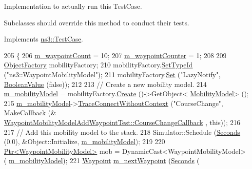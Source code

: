Implementation to actually run this Test\+Case. 

Subclasses should override this method to conduct their tests. 

Implements \hyperlink{classns3_1_1TestCase_a8ff74680cf017ed42011e4be51917a24}{ns3\+::\+Test\+Case}.


\begin{DoxyCode}
205 \{
206   \hyperlink{classWaypointMobilityModelAddWaypointTest_a3db7a04e25567d5d432ff56c33195ba6}{m\_waypointCount} = 10;
207   \hyperlink{classWaypointMobilityModelAddWaypointTest_a7e15fee40f671868d937ca440d71f5e1}{m\_waypointCounter} = 1;
208 
209   \hyperlink{classns3_1_1ObjectFactory}{ObjectFactory} mobilityFactory;
210   mobilityFactory.\hyperlink{classns3_1_1ObjectFactory_a77dcd099064038a1eb7a6b8251229ec3}{SetTypeId} (\textcolor{stringliteral}{"ns3::WaypointMobilityModel"});
211   mobilityFactory.\hyperlink{classns3_1_1ObjectFactory_aef5c0d5019c96bdf01cefd1ff83f4a68}{Set} (\textcolor{stringliteral}{"LazyNotify"}, \hyperlink{classns3_1_1BooleanValue}{BooleanValue} (\textcolor{keyword}{false}));
212 
213   \textcolor{comment}{// Create a new mobility model.}
214   \hyperlink{classWaypointMobilityModelAddWaypointTest_a284c06ea80262b30a4f5670b6ae7e287}{m\_mobilityModel} = mobilityFactory.\hyperlink{classns3_1_1ObjectFactory_a18152e93f0a6fe184ed7300cb31e9896}{Create} ()->GetObject<
      \hyperlink{classns3_1_1MobilityModel}{MobilityModel}> ();
215   \hyperlink{classWaypointMobilityModelAddWaypointTest_a284c06ea80262b30a4f5670b6ae7e287}{m\_mobilityModel}->\hyperlink{classns3_1_1ObjectBase_a1be45f6fd561e75dcac9dfa81b2b81e4}{TraceConnectWithoutContext} (\textcolor{stringliteral}{"CourseChange"}, 
      \hyperlink{group__makecallbackmemptr_ga9376283685aa99d204048d6a4b7610a4}{MakeCallback} (&
      \hyperlink{classWaypointMobilityModelAddWaypointTest_a1863491f2b06dd60f4eefb1fbda45c71}{WaypointMobilityModelAddWaypointTest::CourseChangeCallback}
      , \textcolor{keyword}{this}));
216 
217   \textcolor{comment}{// Add this mobility model to the stack.}
218   Simulator::Schedule (\hyperlink{group__timecivil_ga33c34b816f8ff6628e33d5c8e9713b9e}{Seconds} (0.0), &Object::Initialize, 
      \hyperlink{classWaypointMobilityModelAddWaypointTest_a284c06ea80262b30a4f5670b6ae7e287}{m\_mobilityModel});
219 
220   \hyperlink{classns3_1_1Ptr}{Ptr<WaypointMobilityModel>} mob = DynamicCast<WaypointMobilityModel> (
      \hyperlink{classWaypointMobilityModelAddWaypointTest_a284c06ea80262b30a4f5670b6ae7e287}{m\_mobilityModel});
221   \hyperlink{classns3_1_1Waypoint}{Waypoint} \hyperlink{classWaypointMobilityModelAddWaypointTest_ad6224f8ca856dc076d0f1c6c9b35b2ec}{m\_nextWaypoint} (\hyperlink{group__timecivil_ga33c34b816f8ff6628e33d5c8e9713b9e}{Seconds} (

\end{DoxyCode}
